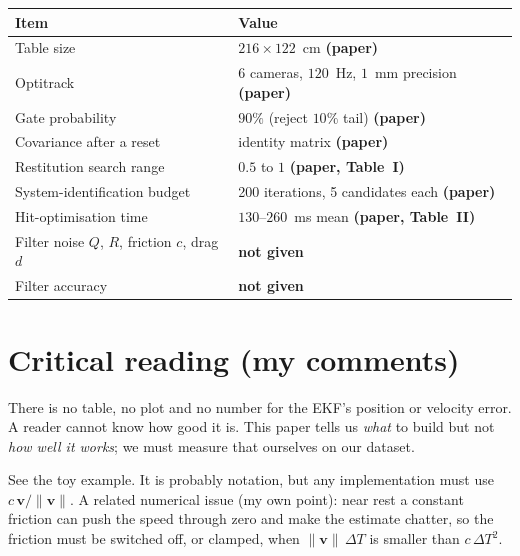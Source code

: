 \documentclass[11pt,a4paper]{article}
\newcommand{\vv}{\bm{v}}
\begin{document}
\begin{center}
\small
\begin{tabularx}{\textwidth}{@{}X l@{}}
\toprule
Item & Value \\
\midrule
Table size & $216\times122$~cm \textbf{(paper)} \\
Optitrack & 6 cameras, $120$~Hz, $1$~mm precision \textbf{(paper)} \\
Gate probability & $90\%$ (reject $10\%$ tail) \textbf{(paper)} \\
Covariance after a reset & identity matrix \textbf{(paper)} \\
Restitution search range & $0.5$ to $1$ \textbf{(paper, Table~I)} \\
System-identification budget & 200 iterations, 5 candidates each \textbf{(paper)} \\
Hit-optimisation time & $130$--$260$~ms mean \textbf{(paper, Table~II)} \\
Filter noise $Q$, $R$, friction $c$, drag $d$ & \textbf{not given} \\
Filter accuracy & \textbf{not given} \\
\bottomrule
\end{tabularx}
\end{center}

\section{Critical reading (my comments)}

\begin{warn}
There is no table, no plot and no number for the EKF's position or velocity error. A reader
cannot know how good it is. This paper tells us \emph{what} to build but not \emph{how well it
works}; we must measure that ourselves on our dataset.
\end{warn}

\begin{warn}
See the toy example. It is probably notation, but any implementation must use
$c\,\vv/\|\vv\|$. A related numerical issue (my own point): near rest a constant friction can push the
speed through zero and make the estimate chatter, so the friction must be switched off, or clamped,
when $\|\vv\|\,\Delta T$ is smaller than $c\,\Delta T^2$.
\end{warn}
\end{document}
